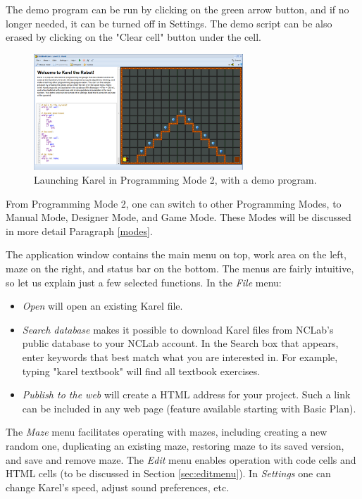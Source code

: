 The demo program can be run by clicking on the green arrow button, and 
if no longer needed, it can be turned off in Settings. The demo script 
can be also erased by clicking on the "Clear cell" button under the cell.

\newpage

\begin{figure}[!ht]
\begin{center}
\includegraphics[width=0.7\textwidth]{img/init.png}
\end{center}
\vspace{-2mm}
\caption{Launching Karel in Programming Mode 2, with a demo program.}
\label{fig:init}
\end{figure}

\noindent
From Programming Mode 2, one can switch to other Programming Modes, to 
Manual Mode, Designer Mode, and Game Mode. These Modes will be discussed 
in more detail Paragraph \ref{modes}.

The application window contains the main menu on top,
work area on the left, maze on the right, and status bar on the bottom.
The menus are fairly intuitive, so let us explain just a few selected 
functions. In the {\em File} menu:

\begin{itemize}
\item {\em Open} will open an existing Karel file.
\item {\em Search database} makes it possible to download Karel files from NCLab's
      public database to your NCLab account. In the Search box that appears, enter 
      keywords that best match what you are interested in. For example, typing 
      "karel textbook" will find all textbook exercises.  
\item {\em Publish to the web} will create a HTML address for your project. Such 
      a link can be included in any web page (feature available starting with Basic Plan). 
\end{itemize}
The {\em Maze} menu facilitates operating with mazes, including creating a new random 
one, duplicating an existing maze, restoring maze to its saved version, and save and remove 
maze. The {\em Edit} menu enables operation with code cells and HTML cells (to be discussed in 
Section \ref{sec:editmenu}). In {\em Settings} one can change Karel's speed, adjust sound 
preferences, etc.


